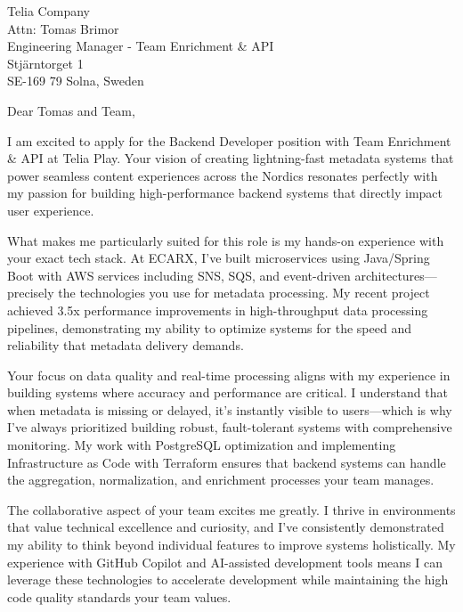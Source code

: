 \documentclass[a4paper,10pt]{article}
\begin{document}
\pagestyle{empty} %

\begin{letter}{\color{darkblue}
Telia Company\\
Attn: Tomas Brimor\\
Engineering Manager - Team Enrichment \& API\\
Stjärntorget 1\\
SE-169 79 Solna, Sweden}

\vspace{30pt}

\opening{Dear Tomas and Team,}

\vspace{8pt}

I am excited to apply for the Backend Developer position with Team Enrichment \& API at Telia Play. Your vision of creating lightning-fast metadata systems that power seamless content experiences across the Nordics resonates perfectly with my passion for building high-performance backend systems that directly impact user experience.

What makes me particularly suited for this role is my hands-on experience with your exact tech stack. At ECARX, I've built microservices using Java/Spring Boot with AWS services including SNS, SQS, and event-driven architectures—precisely the technologies you use for metadata processing. My recent project achieved 3.5x performance improvements in high-throughput data processing pipelines, demonstrating my ability to optimize systems for the speed and reliability that metadata delivery demands.

Your focus on data quality and real-time processing aligns with my experience in building systems where accuracy and performance are critical. I understand that when metadata is missing or delayed, it's instantly visible to users—which is why I've always prioritized building robust, fault-tolerant systems with comprehensive monitoring. My work with PostgreSQL optimization and implementing Infrastructure as Code with Terraform ensures that backend systems can handle the aggregation, normalization, and enrichment processes your team manages.

The collaborative aspect of your team excites me greatly. I thrive in environments that value technical excellence and curiosity, and I've consistently demonstrated my ability to think beyond individual features to improve systems holistically. My experience with GitHub Copilot and AI-assisted development tools means I can leverage these technologies to accelerate development while maintaining the high code quality standards your team values.


\end{letter}
\end{document}
